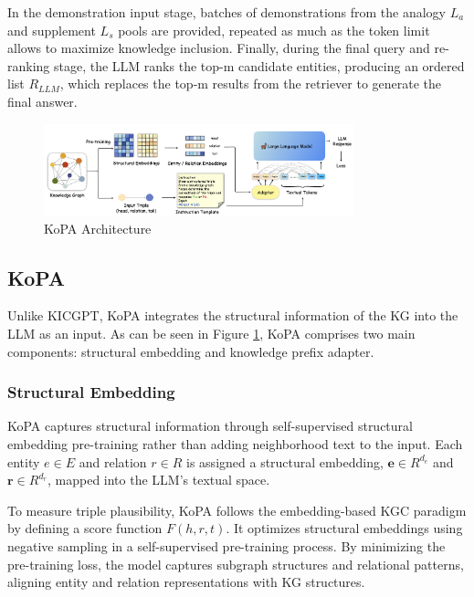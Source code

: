 \documentclass[12pt,a4paper]{article}
\begin{document}
In the demonstration input stage, batches of demonstrations from the
analogy \(L_a\) and supplement \(L_s\) pools are provided, repeated
as much as the token limit allows to maximize knowledge inclusion.
Finally, during the final query and re-ranking stage, the LLM ranks
the top-m candidate entities, producing an ordered list \(R_{LLM}\),
which replaces the top-m results from the retriever to generate the
final answer.

\begin{figure}
    \centering
    \includegraphics[width=0.8\textwidth]{figures/model.001.png}
    \caption{KoPA Architecture \cite{qin2023kopa}}
    \label{fig:KoPAarchitecture}
\end{figure}

\subsection{KoPA}
\label{sec:method:kopa}
Unlike KICGPT, KoPA integrates the structural information of
the KG into the LLM as an input. As can be seen in Figure \ref{fig:KoPAarchitecture},
KoPA comprises two main components: structural
embedding and knowledge prefix adapter.

\subsubsection{Structural Embedding}
KoPA captures structural information through self-supervised
structural embedding pre-training rather than adding neighborhood
text to the input. Each entity \(e \in E\)  and relation \(r \in R\)
is assigned a structural embedding, \(\mathbf{e} \in {R}^{d_e}\)
and \(\mathbf{r} \in {R}^{d_r}\), mapped into the
LLM's textual space.

To measure triple plausibility, KoPA follows the embedding-based
KGC paradigm by defining a score function \(F(h, r, t)\).
It optimizes structural embeddings using negative sampling
in a self-supervised pre-training process. By minimizing the
pre-training loss, the model captures subgraph structures and
relational patterns, aligning entity and relation representations
with KG structures.
\end{document}
